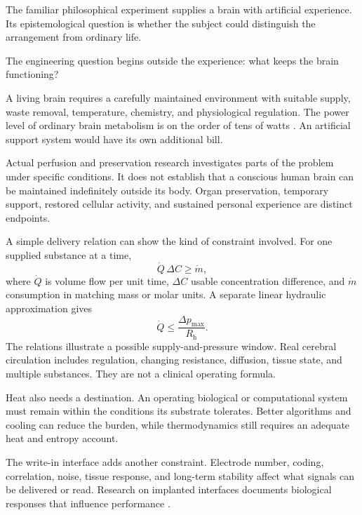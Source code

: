 The familiar philosophical experiment supplies a brain with artificial experience. Its epistemological question is whether the subject could distinguish the arrangement from ordinary life.

The engineering question begins outside the experience: what keeps the brain functioning?

A living brain requires a carefully maintained environment with suitable supply, waste removal, temperature, chemistry, and physiological regulation. The power level of ordinary brain metabolism is on the order of tens of watts \cite{raichle2002}. An artificial support system would have its own additional bill.

Actual perfusion and preservation research investigates parts of the problem under specific conditions. It does not establish that a conscious human brain can be maintained indefinitely outside its body. Organ preservation, temporary support, restored cellular activity, and sustained personal experience are distinct endpoints.

A simple delivery relation can show the kind of constraint involved. For one supplied substance at a time,
\begin{equation}
 \dot Q\,\Delta C\geq\dot m,
\end{equation}
where $\dot Q$ is volume flow per unit time, $\Delta C$ usable concentration difference, and $\dot m$ consumption in matching mass or molar units. A separate linear hydraulic approximation gives
\begin{equation}
 \dot Q\leq\frac{\Delta p_{\max}}{R_{\mathrm h}}.
\end{equation}
The relations illustrate a possible supply-and-pressure window. Real cerebral circulation includes regulation, changing resistance, diffusion, tissue state, and multiple substances. They are not a clinical operating formula.

Heat also needs a destination. An operating biological or computational system must remain within the conditions its substrate tolerates. Better algorithms and cooling can reduce the burden, while thermodynamics still requires an adequate heat and entropy account.

The write-in interface adds another constraint. Electrode number, coding, correlation, noise, tissue response, and long-term stability affect what signals can be delivered or read. Research on implanted interfaces documents biological responses that influence performance \cite{polikov2005response}.

